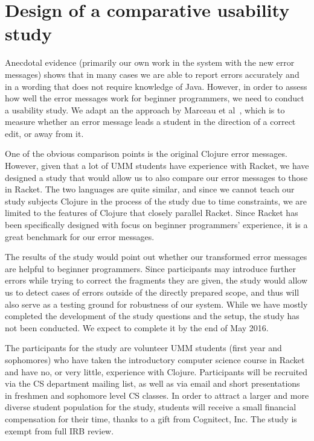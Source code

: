 \documentclass[submission,copyright,creativecommons]{eptcs}
\newcommand{\allcomments}[1]{{#1}}
\newcommand{\emcomment}[1]{{\bf \textcolor{ForestGreen}{\allcomments{{#1}}}}}
\begin{document}

\section{Design of a comparative usability study}\label{sec:study}
Anecdotal evidence (primarily our own work in the system with the new error messages) shows that 
in many cases we are able to report errors accurately and in a wording that does not require 
knowledge of Java. However, in order to assess how well the error messages work for beginner 
programmers, we need to conduct a usability study. 
We adapt an the approach by Marceau et al~\cite{Marceau:2011}, which is to measure whether an error message 
leads a student in the direction of a correct edit, or away from it. 

One of the obvious comparison points is the original Clojure error messages. However, given that 
a lot of UMM students have experience with Racket, we have designed a study that would allow us 
to also compare our error messages to those in Racket. 
The two languages are quite similar, and since we
cannot teach our study subjects Clojure in the process of the study due to time constraints, we are 
limited to the features of Clojure that closely parallel Racket. 
Since Racket has been specifically designed with focus on beginner programmers' experience,
it is a great benchmark for our error messages. 

The results of the study would point out whether our transformed error messages are helpful to beginner 
programmers. 
Since participants may introduce further errors while trying to correct the fragments they are given, 
the study would allow us to detect cases of errors outside of the directly prepared scope, and thus
will also serve as a testing ground for robustness of our system.  
While we have mostly completed the development of the study questions and the setup, the
study has not been conducted. We expect to complete it by the end of May 2016. 

The participants for the study are volunteer UMM students (first year and sophomores) who have taken the introductory computer science course in Racket and have no, or very little, experience with Clojure.
Participants will be recruited via the CS department mailing list, as well as via email and short presentations in freshmen and sophomore level CS classes. 
In order to attract a larger and more diverse student population for the study, students will receive a small financial compensation for their time, thanks to a gift from Cognitect, Inc. 
The study is exempt from full IRB review. 
\end{document}
